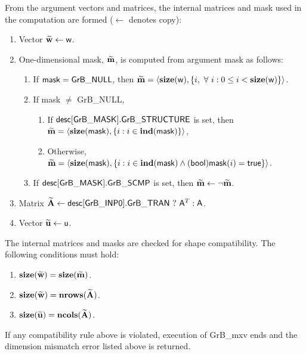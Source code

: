 From the argument vectors and matrices, the internal matrices and mask used in 
the computation are formed ($\leftarrow$ denotes copy):
\begin{enumerate}
	\item Vector ${\bf \widetilde{w}} \leftarrow {\sf w}$.

	\item One-dimensional mask, ${\bf \widetilde{m}}$, is computed from 
    argument {\sf mask} as follows:
	\begin{enumerate}
		\item If ${\sf mask} = {\sf GrB\_NULL}$, then ${\bf \widetilde{m}} = 
        \langle \bold{size}({\sf w}), \{i, \ \forall \ i : 0 \leq i < 
        \bold{size}({\sf w}) \} \rangle$.

		\item If {\sf mask} $\ne$ {\sf GrB\_NULL},  
        \begin{enumerate}
            \item If ${\sf desc[GrB\_MASK].GrB\_STRUCTURE}$ is set, then
            ${\bf \widetilde{m}} = 
            \langle \bold{size}({\sf mask}), \{i : i \in \bold{ind}({\sf mask}) \} \rangle$,
            \item Otherwise, ${\bf \widetilde{m}} = 
            \langle \bold{size}({\sf mask}), \{i : i \in \bold{ind}({\sf mask}) \wedge
            ({\sf bool}){\sf mask}(i) = {\sf true} \} \rangle$.
        \end{enumerate}

		\item	If ${\sf desc[GrB\_MASK].GrB\_SCMP}$ is set, then 
        ${\bf \widetilde{m}} \leftarrow \neg {\bf \widetilde{m}}$.
	\end{enumerate}

	\item Matrix ${\bf \widetilde{A}} \leftarrow {\sf desc[GrB\_INP0].GrB\_TRAN} \ ? \ {\sf A}^T : {\sf A}$.

	\item Vector ${\bf \widetilde{u}} \leftarrow {\sf u}$.
\end{enumerate}

The internal matrices and masks are checked for shape compatibility. The following 
conditions must hold:
\begin{enumerate}
	\item $\bold{size}({\bf \widetilde{w}}) = \bold{size}({\bf \widetilde{m}})$.

	\item $\bold{size}({\bf \widetilde{w}}) = \bold{nrows}({\bf \widetilde{A}})$.

	\item $\bold{size}({\bf \widetilde{u}}) = \bold{ncols}({\bf \widetilde{A}})$.
\end{enumerate}
If any compatibility rule above is violated, execution of {\sf GrB\_mxv} ends and 
the dimension mismatch error listed above is returned.


